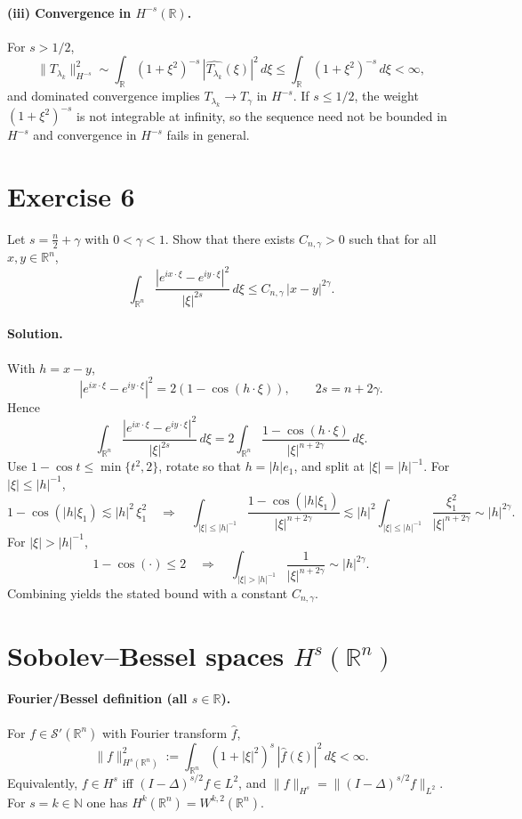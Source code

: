 \documentclass[12pt,a4paper]{article}
\theoremstyle{plain}
\theoremstyle{definition}
\theoremstyle{remark}
\theoremstyle{remark}
\begin{document}
\paragraph{(iii) Convergence in $H^{-s}(\mathbb R)$.}
For $s>1/2$,
\[
\|T_{\lambda_k}\|_{H^{-s}}^2 \sim \int_{\mathbb R}(1+\xi^2)^{-s}\,|\widehat{T_{\lambda_k}}(\xi)|^2\,d\xi
\le \int_{\mathbb R}(1+\xi^2)^{-s}\,d\xi<\infty,
\]
and dominated convergence implies $T_{\lambda_k}\to T_\gamma$ in $H^{-s}$.
If $s\le 1/2$, the weight $(1+\xi^2)^{-s}$ is not integrable at infinity, so the sequence need not be bounded in $H^{-s}$ and convergence in $H^{-s}$ fails in general.

\bigskip

\section*{Exercise 6}
Let $s=\frac n2+\gamma$ with $0<\gamma<1$. Show that there exists $C_{n,\gamma}>0$ such that for all $x,y\in\mathbb R^n$,
\[
\int_{\mathbb R^n}\frac{|e^{ix\cdot\xi}-e^{iy\cdot\xi}|^2}{|\xi|^{2s}}\,d\xi
\le C_{n,\gamma}\,|x-y|^{2\gamma}.
\]

\paragraph{Solution.}
With $h=x-y$,
\[
|e^{ix\cdot\xi}-e^{iy\cdot\xi}|^2=2(1-\cos(h\cdot\xi)),
\qquad
2s=n+2\gamma.
\]
Hence
\[
\int_{\mathbb R^n}\frac{|e^{ix\cdot\xi}-e^{iy\cdot\xi}|^2}{|\xi|^{2s}}\,d\xi
=2\!\int_{\mathbb R^n}\frac{1-\cos(h\cdot\xi)}{|\xi|^{n+2\gamma}}\,d\xi.
\]
Use $1-\cos t\le \min\{t^2,2\}$, rotate so that $h=|h|e_1$, and split at $|\xi|=|h|^{-1}$.
For $|\xi|\le |h|^{-1}$,
\[
1-\cos(|h|\xi_1)\lesssim |h|^2\,\xi_1^2
\quad\Rightarrow\quad
\int_{|\xi|\le |h|^{-1}}\frac{1-\cos(|h|\xi_1)}{|\xi|^{n+2\gamma}}
\lesssim |h|^2 \int_{|\xi|\le |h|^{-1}}\frac{\xi_1^2}{|\xi|^{n+2\gamma}}
\sim |h|^{2\gamma}.
\]
For $|\xi|>|h|^{-1}$,
\[
1-\cos(\cdot)\le 2
\quad\Rightarrow\quad
\int_{|\xi|>|h|^{-1}}\frac{1}{|\xi|^{n+2\gamma}}
\sim |h|^{2\gamma}.
\]
Combining yields the stated bound with a constant $C_{n,\gamma}$.

\section*{Sobolev--Bessel spaces $H^s(\mathbb R^n)$}

\paragraph{Fourier/Bessel definition (all $s\in\mathbb R$).}
For $f\in\mathcal S'(\mathbb R^n)$ with Fourier transform $\widehat f$,
\[
\|f\|_{H^s(\mathbb R^n)}^2 := \int_{\mathbb R^n} (1+|\xi|^2)^s\,|\widehat f(\xi)|^2\,d\xi < \infty.
\]
Equivalently, $f\in H^s$ iff $(I-\Delta)^{s/2}f\in L^2$, and
$\|f\|_{H^s}=\|(I-\Delta)^{s/2}f\|_{L^2}$.
For $s=k\in\mathbb N$ one has $H^k(\mathbb R^n)=W^{k,2}(\mathbb R^n)$.
\end{document}
